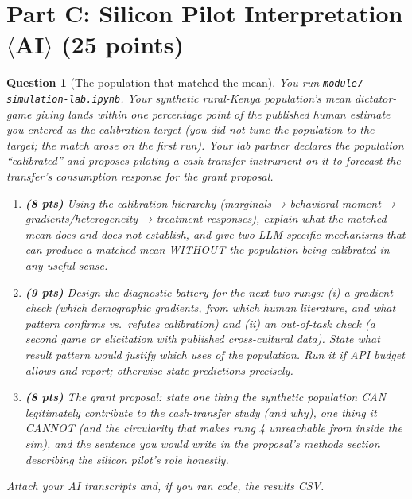 \documentclass[11pt]{article}
\newtheorem{question}{Question}
\begin{document}
\section*{Part C: Silicon Pilot Interpretation $\langle$AI$\rangle$
(25 points)}

\begin{question}[The population that matched the mean]
You run \texttt{module7-simulation-lab.ipynb}. Your synthetic
rural-Kenya population's mean dictator-game giving lands within one
percentage point of the published human estimate you entered as the
calibration target (you did not tune the population to the target; the
match arose on the first run). Your lab partner declares the population
``calibrated'' and proposes piloting a cash-transfer instrument on it to
forecast the transfer's consumption response for the grant proposal.

\begin{enumerate}[label=(\alph*)]
  \item \textbf{(8 pts)} Using the calibration hierarchy (marginals →
        behavioral moment → gradients/heterogeneity → treatment
        responses), explain what the matched mean does and does not
        establish, and give two LLM-specific mechanisms that can
        produce a matched mean WITHOUT the population being calibrated
        in any useful sense.
  \item \textbf{(9 pts)} Design the diagnostic battery for the next two
        rungs: (i) a gradient check (which demographic gradients, from
        which human literature, and what pattern confirms vs.\ refutes
        calibration) and (ii) an out-of-task check (a second game or
        elicitation with published cross-cultural data). State what
        result pattern would justify which uses of the population. Run
        it if API budget allows and report; otherwise state predictions
        precisely.
  \item \textbf{(8 pts)} The grant proposal: state one thing the
        synthetic population CAN legitimately contribute to the
        cash-transfer study (and why), one thing it CANNOT (and the
        circularity that makes rung 4 unreachable from inside the
        sim), and the sentence you would write in the proposal's
        methods section describing the silicon pilot's role honestly.
\end{enumerate}
Attach your AI transcripts and, if you ran code, the results CSV.
\end{question}
\end{document}
